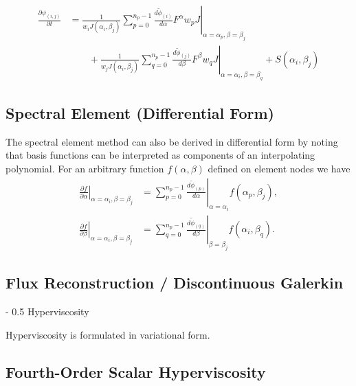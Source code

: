 \documentclass{article}
\makeatletter
\renewcommand\section{\@startsection
  {section}{2}{0mm}%
  {-\baselineskip}%
  {0.5\baselineskip}%
  {\normalfont\Huge\bfseries}}%
\newcommand{\diff}[2]{\frac{d #1}{d #2}}
\newcommand{\pdiff}[2]{\frac{\partial #1}{\partial #2}}
\makeatother
\begin{document}
\begin{align}
\pdiff{\psi_{(i,j)}}{t} &= \frac{1}{w_i J(\alpha_i, \beta_j)} \sum_{p = 0}^{n_p-1} \left. \diff{\tilde{\phi}_{(i)}}{\alpha} F^\alpha w_p J \right\vert_{\alpha = \alpha_p, \beta = \beta_j} \nonumber \\
& \qquad + \frac{1}{w_j J(\alpha_i, \beta_j)} \sum_{q = 0}^{n_p-1} \left. \diff{\tilde{\phi}_{(j)}}{\beta} F^\beta w_q J \right\vert_{\alpha = \alpha_i, \beta = \beta_q} + S(\alpha_i, \beta_j)
\end{align}

\subsection{Spectral Element (Differential Form)}

The spectral element method can also be derived in differential form by noting that basis functions can be interpreted as components of an interpolating polynomial.  For an arbitrary function $f(\alpha, \beta)$ defined on element nodes we have
\begin{align}
\left. \pdiff{f}{\alpha} \right\vert_{\alpha = \alpha_i, \beta = \beta_j} &= \sum_{p=0}^{n_p-1} \left. \diff{\tilde{\phi}_{(p)}}{\alpha} \right\vert_{\alpha = \alpha_i} f(\alpha_p, \beta_j), \\
\left. \pdiff{f}{\beta} \right\vert_{\alpha = \alpha_i, \beta = \beta_j} &= \sum_{q=0}^{n_p-1} \left. \diff{\tilde{\phi}_{(q)}}{\beta} \right\vert_{\beta = \beta_j} f(\alpha_i, \beta_q).
\end{align}

\subsection{Flux Reconstruction / Discontinuous Galerkin}

\section{Hyperviscosity}

Hyperviscosity is formulated in variational form.

\subsection{Fourth-Order Scalar Hyperviscosity}
\end{document}
